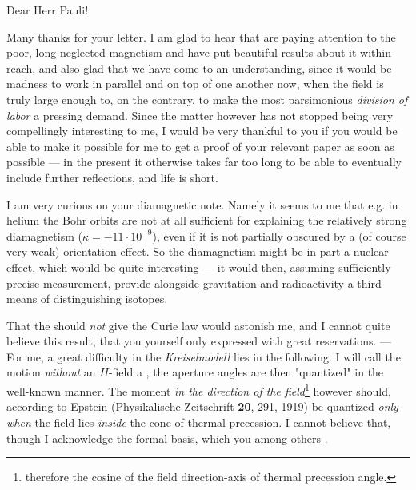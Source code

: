 \begin{letter}{8}
\begin{header}
\date{1920/07/12}

\makeheader

\end{header}

Dear Herr Pauli!

Many thanks for your letter. I am glad to hear that are paying attention to the poor, long-neglected magnetism and have put beautiful results about it within reach, and also glad that we have come to an understanding, since it would be madness to work in parallel and on top of one another now, when the field  is truly large enough to, on the contrary, to make the most parsimonious \textit{division of labor} a pressing demand. Since the matter however has not stopped being very compellingly interesting to me, I would be very thankful to you if you would be able to make it possible for me  to get a proof of your relevant paper as soon as possible — in the present  it otherwise takes far too long to be able to eventually include further reflections, and life is short.

I am very curious on your diamagnetic note. Namely it seems to me that e.g. in helium the Bohr orbits are not at all sufficient for explaining the relatively strong diamagnetism ($\kappa = -11\cdot 10^{-9}$), even if it is not partially obscured by a (of course very weak) orientation effect. So the diamagnetism might be in part a nuclear effect, which would be quite interesting — it would then, assuming sufficiently precise measurement, provide alongside gravitation and radioactivity a third means of distinguishing isotopes.

That the  should \textit{not} give the Curie law would astonish me, and I cannot quite believe this result, that you yourself only expressed with great reservations. — For me, a great difficulty in the \textit{Kreiselmodell} lies in the following. I will call the motion \textit{without} an $H$-field a , the aperture angles are then "quantized" in the well-known manner. The moment \textit{in the direction of the field}\footnote{therefore the cosine of the field direction-axis of thermal precession angle.} however should, according to Epstein (Physikalische Zeitschrift \textbf{20}, 291, 1919) be quantized \textit{only when} the field lies \textit{inside} the cone of thermal precession. I cannot believe that, though I acknowledge the formal basis, which you among others .


\end{letter}
